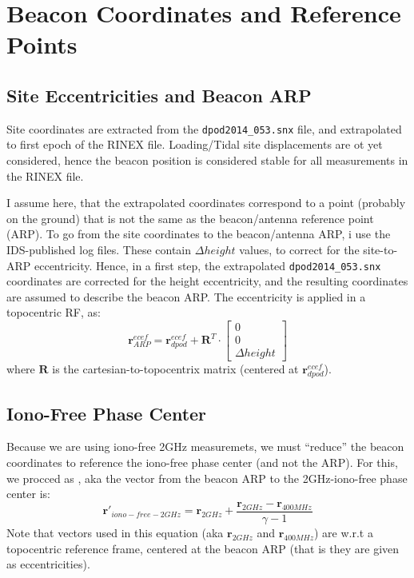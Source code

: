 \section{Beacon Coordinates and Reference Points}
\label{sec:beacon-coordiates-and-reference-points}

\subsection{Site Eccentricities and Beacon ARP}
\label{ssec:site-eccentricities-and-beacon-arp}
Site coordinates are extracted from the \texttt{dpod2014\_053.snx} file, and 
extrapolated to first epoch of the RINEX file. {\color{brown} Loading/Tidal site 
displacements are ot yet considered}, hence the beacon position is considered 
stable for all measurements in the RINEX file.

I assume here, that the extrapolated coordinates correspond to a point (probably 
on the ground) that is not the same as the beacon/antenna reference point (ARP). 
To go from the site coordinates to the beacon/antenna ARP, i use the IDS-published 
log files. These contain $\Delta height$ values, to correct for the site-to-ARP 
eccentricity. Hence, in a first step, the extrapolated \texttt{dpod2014\_053.snx} 
coordinates are corrected for the height eccentricity, and the resulting 
coordinates are assumed to describe the beacon ARP. The eccentricity is applied 
in a topocentric RF, as:
\begin{equation}
  \bm{r}_{ARP}^{ecef} = \bm{r}_{dpod}^{ecef} + \bm{R}^T \cdot 
    \begin{bmatrix} 0\\ 0\\ \Delta height\end{bmatrix}
\end{equation}
where $\bm{R}$ is the cartesian-to-topocentrix matrix (centered at $\bm{r}_{dpod}^{ecef}$).

\subsection{Iono-Free Phase Center}
\label{ssec:iono-free-phase-center}
Because we are using iono-free 2GHz measuremets, we must ``reduce'' the beacon 
coordinates to reference the iono-free phase center (and not the ARP). For this, 
we procced as \cite{lemoine-2016}, aka the vector from the beacon ARP to the
2GHz-iono-free phase center is:
\begin{equation}
  \bm{r}'_{iono-free-2GHz} = \bm{r}_{2GHz} + 
    \frac{\bm{r}_{2GHz} - \bm{r}_{400MHz}}{\gamma - 1}
\end{equation}
Note that vectors used in this equation (aka $\bm{r}_{2GHz}$ and $\bm{r}_{400MHz}$) 
are w.r.t a topocentric reference frame, centered at the beacon ARP (that is they 
are given as eccentricities).

